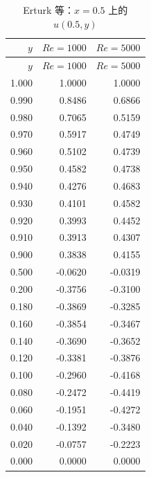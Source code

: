 \documentclass[UTF8,a4paper,11pt]{ctexart}
\begin{document}
\begin{longtable}{r|rr}
\caption{Erturk 等\cite{Erturk2005}：\(x=0.5\) 上的 \(u(0.5,y)\)}
\label{tab:erturk-u}\\
\toprule
\(y\) & \(Re=1000\) & \(Re=5000\) \\
\midrule
\endfirsthead
\toprule
\(y\) & \(Re=1000\) & \(Re=5000\) \\
\midrule
\endhead
1.000 & 1.0000 & 1.0000 \\
0.990 & 0.8486 & 0.6866 \\
0.980 & 0.7065 & 0.5159 \\
0.970 & 0.5917 & 0.4749 \\
0.960 & 0.5102 & 0.4739 \\
0.950 & 0.4582 & 0.4738 \\
0.940 & 0.4276 & 0.4683 \\
0.930 & 0.4101 & 0.4582 \\
0.920 & 0.3993 & 0.4452 \\
0.910 & 0.3913 & 0.4307 \\
0.900 & 0.3838 & 0.4155 \\
0.500 & -0.0620 & -0.0319 \\
0.200 & -0.3756 & -0.3100 \\
0.180 & -0.3869 & -0.3285 \\
0.160 & -0.3854 & -0.3467 \\
0.140 & -0.3690 & -0.3652 \\
0.120 & -0.3381 & -0.3876 \\
0.100 & -0.2960 & -0.4168 \\
0.080 & -0.2472 & -0.4419 \\
0.060 & -0.1951 & -0.4272 \\
0.040 & -0.1392 & -0.3480 \\
0.020 & -0.0757 & -0.2223 \\
0.000 & 0.0000 & 0.0000 \\
\bottomrule
\end{longtable}
\end{document}
